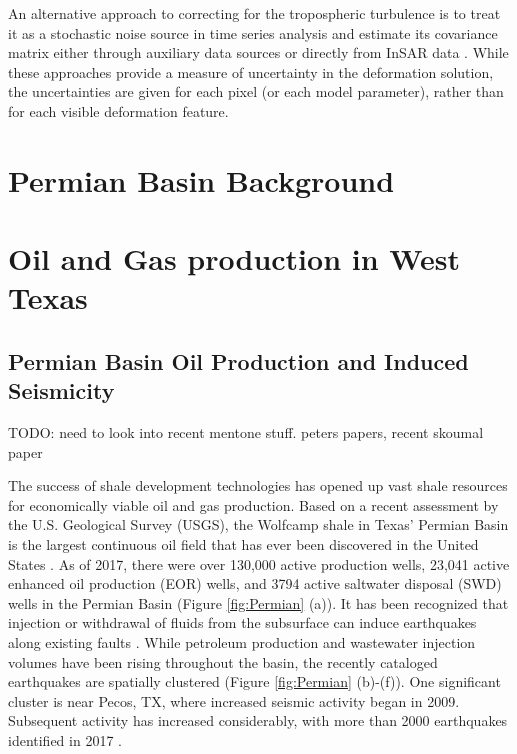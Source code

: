 \documentclass{utexasthesis}
\begin{document}
An alternative approach to correcting for the tropospheric turbulence is to treat it as a stochastic noise source in time series analysis \cite{Simons2007InterferometricSyntheticAperture, Agram2015NoiseModelInsar} and estimate its covariance matrix either through auxiliary data sources \cite{Barnhart2013CharacterizingEstimatingNoise, Parker2015SystematicAssessmentAtmospheric} or directly from InSAR data \cite{Lohman2005SomeThoughtsUse}. While these approaches provide a measure of uncertainty in the deformation solution, the uncertainties are given for each pixel (or each model parameter), rather than for each visible deformation feature.


\chapter{Permian Basin Background}


\chapter{Oil and Gas production in West Texas}

\section{Permian Basin Oil Production and Induced Seismicity}

TODO: need to look into recent mentone stuff. peters papers, recent skoumal paper

The success of shale development technologies \cite{Waters2006use} has opened up vast shale resources for economically viable oil and gas production. Based on a recent assessment by the U.S. Geological Survey (USGS), the Wolfcamp shale in Texas' Permian Basin is the largest continuous oil field that has ever been discovered in the United States \cite{GaswirthAssessment2016}. As of 2017, there were over 130,000 active production wells, 23,041 active enhanced oil production (EOR) wells, and 3794 active saltwater disposal (SWD) wells in the Permian Basin (Figure \ref{fig:Permian} (a)). It has been recognized that injection or withdrawal of fluids from the subsurface can induce earthquakes along existing faults \cite{Ellsworth2013, simpson1988two}. While petroleum production and wastewater injection volumes have been rising throughout the basin, the recently cataloged earthquakes are spatially clustered (Figure \ref{fig:Permian} (b)-(f)). One significant cluster is near Pecos, TX, where increased seismic activity began in 2009. Subsequent activity has increased considerably, with more than 2000 earthquakes identified in 2017 \cite{Frohlich2019}.
\end{document}
